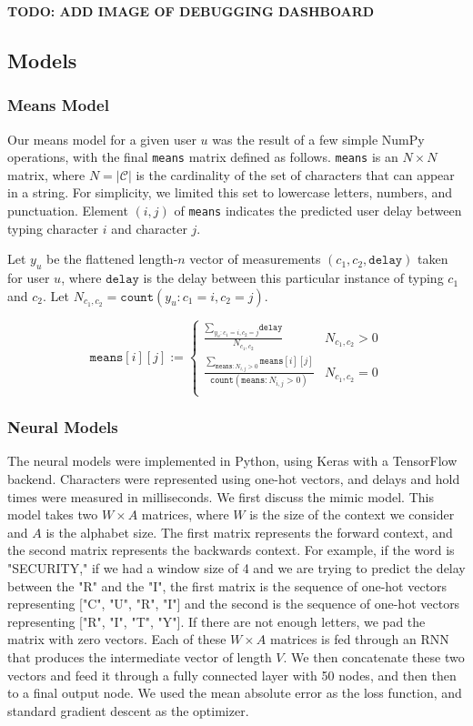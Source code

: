 \documentclass{amsart}
\begin{document}
\begin{multicols*}{2}
\textbf{TODO: ADD IMAGE OF DEBUGGING DASHBOARD}

\subsection{Models}
\subsubsection{Means Model}
Our means model for a given user $u$ was the result of a few simple NumPy operations, with the final \texttt{means} matrix defined as follows. \texttt{means} is an $N \times N$ matrix, where $N = |\mathcal{C}|$ is the cardinality of the set of characters that can appear in a string. For simplicity, we limited this set to lowercase letters, numbers, and punctuation. Element $(i, j)$ of \texttt{means} indicates the predicted user delay between typing character $i$ and character $j$.

Let $y_u$ be the flattened length-$n$ vector of measurements $(c_1, c_2, \texttt{delay})$ taken for user $u$, where $\texttt{delay}$ is the delay between this particular instance of typing $c_1$ and $c_2$. Let $N_{c_1, c_2} = \texttt{count}(y_u : c_1 = i, c_2 = j)$.

\[ \texttt{means}[i][j] :=
  \begin{cases}
      \frac{\sum_{y_u : c_1 = i, c_2 = j}{\texttt{delay}}}{N_{c_1, c_2}} & N_{c_1, c_2} > 0 \\
      \frac{\sum_{\texttt{means} : N_{i, j} > 0}{\texttt{means}[i][j]}}{\texttt{count}(\texttt{means} : N_{i, j} > 0)} & N_{c_1, c_2} = 0 \\
   \end{cases}
\]

\subsubsection{Neural Models}
The neural models were implemented in Python, using Keras with a TensorFlow backend. Characters were represented using one-hot vectors, and delays and hold times were measured in milliseconds. We first discuss the mimic model. This model takes two $W \times A$ matrices, where $W$ is the size of the context we consider and $A$ is the alphabet size. The first matrix represents the forward context, and the second matrix represents the backwards context. For example, if the word is "SECURITY," if we had a window size of 4 and we are trying to predict the delay between the "R" and the "I", the first matrix is the sequence of one-hot vectors representing ["C", "U", "R", "I"] and the second is the sequence of one-hot vectors representing ["R", "I", "T", "Y"]. If there are not enough letters, we pad the matrix with zero vectors. Each of these $W \times A$ matrices is fed through an RNN that produces the intermediate vector of length $V$. We then concatenate these two vectors and feed it through a fully connected layer with 50 nodes, and then then to a final output node. We used the mean absolute error as the loss function, and standard gradient descent as the optimizer.


\end{multicols*}
\end{document}

